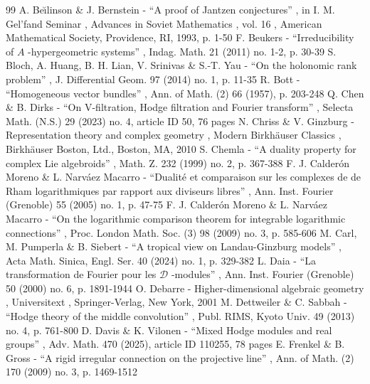 \documentclass[11pt]{article}
\begin{document}

\begin{thebibliography}{99}
 A. Be\u{\i}linson \& J. Bernstein - “A proof of Jantzen conjectures” , in I. M. Gel’fand Seminar , Advances in Soviet Mathematics , vol. 16 , American Mathematical Society, Providence, RI, 1993, p. 1-50
 F. Beukers - “Irreducibility of $A$ -hypergeometric systems” , Indag. Math. 21 (2011) no. 1-2, p. 30-39
 S. Bloch, A. Huang, B. H. Lian, V. Srinivas \& S.-T. Yau - “On the holonomic rank problem” , J. Differential Geom. 97 (2014) no. 1, p. 11-35
 R. Bott - “Homogeneous vector bundles” , Ann. of Math. (2) 66 (1957), p. 203-248
 Q. Chen \& B. Dirks - “On V-filtration, Hodge filtration and Fourier transform” , Selecta Math. (N.S.) 29 (2023) no. 4, article ID 50, 76 pages
 N. Chriss \& V. Ginzburg - Representation theory and complex geometry , Modern Birkhäuser Classics , Birkhäuser Boston, Ltd., Boston, MA, 2010
 S. Chemla - “A duality property for complex Lie algebroids” , Math. Z. 232 (1999) no. 2, p. 367-388
 F. J. Calderón Moreno \& L. Narváez Macarro - “Dualité et comparaison sur les complexes de de Rham logarithmiques par rapport aux diviseurs libres” , Ann. Inst. Fourier (Grenoble) 55 (2005) no. 1, p. 47-75
 F. J. Calderón Moreno \& L. Narváez Macarro - “On the logarithmic comparison theorem for integrable logarithmic connections” , Proc. London Math. Soc. (3) 98 (2009) no. 3, p. 585-606
 M. Carl, M. Pumperla \& B. Siebert - “A tropical view on Landau-Ginzburg models” , Acta Math. Sinica, Engl. Ser. 40 (2024) no. 1, p. 329-382
 L. Daia - “La transformation de Fourier pour les $\mathcal{D}$ -modules” , Ann. Inst. Fourier (Grenoble) 50 (2000) no. 6, p. 1891-1944
 O. Debarre - Higher-dimensional algebraic geometry , Universitext , Springer-Verlag, New York, 2001
 M. Dettweiler \& C. Sabbah - “Hodge theory of the middle convolution” , Publ. RIMS, Kyoto Univ. 49 (2013) no. 4, p. 761-800
 D. Davis \& K. Vilonen - “Mixed Hodge modules and real groups” , Adv. Math. 470 (2025), article ID 110255, 78 pages
 E. Frenkel \& B. Gross - “A rigid irregular connection on the projective line” , Ann. of Math. (2) 170 (2009) no. 3, p. 1469-1512

\end{thebibliography}
\end{document}
